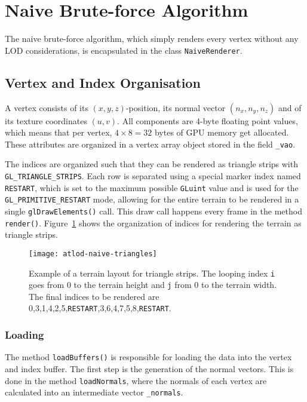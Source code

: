 \section{Naive Brute-force Algorithm}
The naive brute-force algorithm, which simply renders every vertex without any LOD considerations, is encapsulated in the class \texttt{NaiveRenderer}.

\subsection{Vertex and Index Organisation}
A vertex consists of its $(x,y,z)$-position,
its normal vector $(n_x,n_y,n_z)$ and of its
texture coordinates $(u,v)$. All components
are 4-byte floating point values, which means that 
per vertex, $4 \times 8 = 32$ bytes of GPU memory
get allocated. These attributes are organized 
in a vertex array object stored in the field \texttt{\_vao}.

The indices are organized such that they can be rendered as triangle strips with \texttt{GL\_TRIANGLE\_STRIPS}.
Each row is separated using a special marker index named \texttt{RESTART}, which is set to the maximum possible \texttt{GLuint} value and is used for the \texttt{GL\_PRIMITIVE\_RESTART} mode,
allowing for the entire terrain to be rendered in a single \texttt{glDrawElements()} call. This draw call happens every frame in the 
method \texttt{render()}. Figure~\ref{fig:naive-triangles} shows the organization of indices for rendering the terrain as triangle strips.

\begin{figure}[H]
  \centering
  \texttt{[image: atlod-naive-triangles]}
  \caption{Example of a terrain layout for triangle strips. The looping index \texttt{i} goes from 0 to the terrain height and \texttt{j} from 0 to the terrain width. The final indices to be rendered are 0,3,1,4,2,5,\texttt{RESTART},3,6,4,7,5,8,\texttt{RESTART}.}\label{fig:naive-triangles}
\end{figure}

\subsubsection{Loading}
The method \texttt{loadBuffers()} is responsible for loading the data into the vertex and index buffer.
The first step is the generation of the normal vectors. This is done in the method \texttt{loadNormals},
where the normals of each vertex are calculated into an intermediate vector \texttt{\_normals}.

